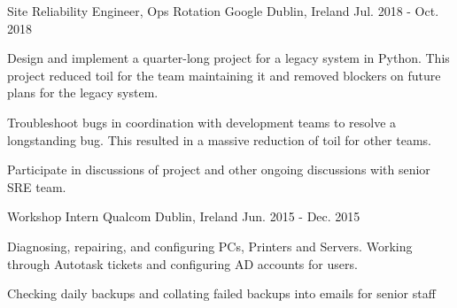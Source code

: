 \begin{cventries}
  \cventry
    {Site Reliability Engineer, Ops Rotation} %
    {Google} %
    {Dublin, Ireland} %
    {Jul. 2018 - Oct. 2018} %
    {
      \begin{cvitems} %
        \item {Design and implement a quarter-long project for a legacy system in Python. This project reduced toil for the team maintaining it and removed blockers on future plans for the legacy system.}
        \item {Troubleshoot bugs in coordination with development teams to resolve a longstanding bug. This resulted in a massive reduction of toil for other teams.}
        \item {Participate in discussions of project and other ongoing discussions with senior SRE team.}
      \end{cvitems}
    }

  \cventry
    {Workshop Intern} %
    {Qualcom} %
    {Dublin, Ireland} %
    {Jun. 2015 - Dec. 2015} %
    {
      \begin{cvitems} %
        \item {Diagnosing, repairing, and configuring PCs, Printers and Servers. Working through Autotask tickets and configuring AD accounts for users.}
        \item {Checking daily backups and collating failed backups into emails for senior staff}
      \end{cvitems}
    }
\end{cventries}

